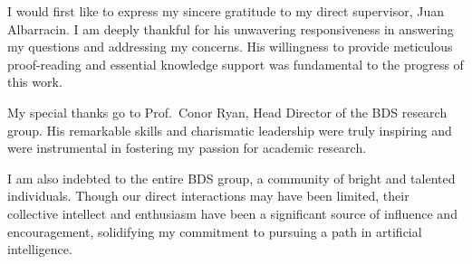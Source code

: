 
\begin{acknowledgements}    

    I would first like to express my sincere gratitude to my direct supervisor, Juan Albarracin. 
    I am deeply thankful for his unwavering responsiveness in answering my questions and addressing my concerns. 
    His willingness to provide meticulous proof-reading and essential knowledge support was fundamental to the progress of this work.

    My special thanks go to Prof.~Conor Ryan, Head Director of the BDS research group. 
    His remarkable skills and charismatic leadership were truly inspiring and were instrumental in fostering my passion for academic research.

    I am also indebted to the entire BDS group, a community of bright and talented individuals. 
    Though our direct interactions may have been limited, their collective intellect and enthusiasm have been a significant source of influence and encouragement, solidifying my commitment to pursuing a path in artificial intelligence.






\end{acknowledgements}

